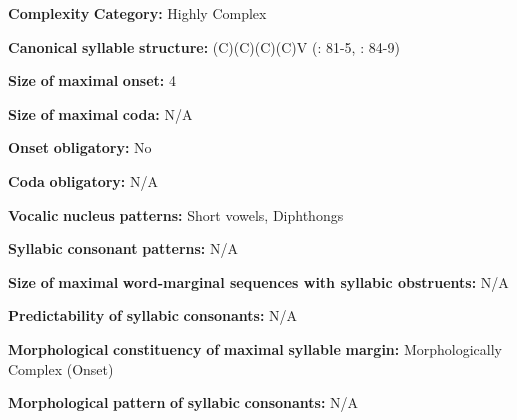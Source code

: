 \begin{styleBody}
\textbf{Complexity} \textbf{Category:} Highly Complex
\end{styleBody}

\begin{styleBody}
\textbf{Canonical} \textbf{syllable} \textbf{structure:} (C)(C)(C)(C)V (\citealt{Howard1967}: 81-5, \citealt{Howard1972}: 84-9)
\end{styleBody}

\begin{styleBody}
\textbf{Size} \textbf{of} \textbf{maximal} \textbf{onset:} 4
\end{styleBody}

\begin{styleBody}
\textbf{Size} \textbf{of} \textbf{maximal} \textbf{coda:} N/A
\end{styleBody}

\begin{styleBody}
\textbf{Onset} \textbf{obligatory:} No
\end{styleBody}

\begin{styleBody}
\textbf{Coda} \textbf{obligatory:} N/A
\end{styleBody}

\begin{styleBody}
\textbf{Vocalic} \textbf{nucleus} \textbf{patterns:} Short vowels, Diphthongs
\end{styleBody}

\begin{styleBody}
\textbf{Syllabic} \textbf{consonant} \textbf{patterns:} N/A
\end{styleBody}

\begin{styleBody}
\textbf{Size} \textbf{of} \textbf{maximal} \textbf{word{}-marginal sequences with syllabic obstruents:} N/A
\end{styleBody}

\begin{styleBody}
\textbf{Predictability} \textbf{of} \textbf{syllabic} \textbf{consonants:} N/A
\end{styleBody}

\begin{styleBody}
\textbf{Morphological} \textbf{constituency} \textbf{of} \textbf{maximal} \textbf{syllable} \textbf{margin:} Morphologically Complex (Onset)
\end{styleBody}

\begin{styleBody}
\textbf{Morphological} \textbf{pattern} \textbf{of} \textbf{syllabic} \textbf{consonants:} N/A
\end{styleBody}

